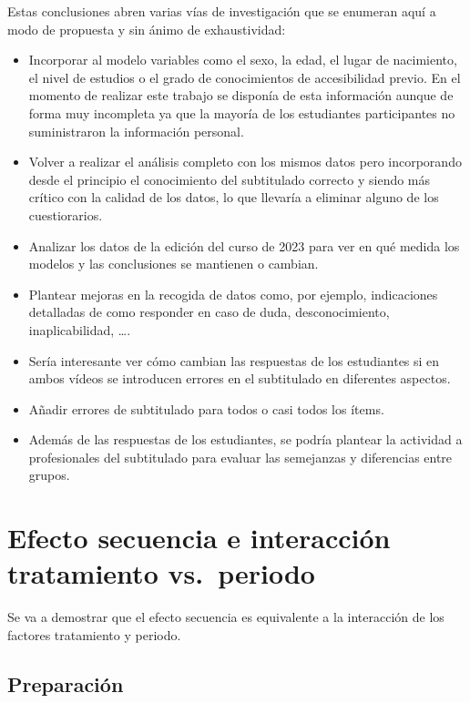 \documentclass[
  12pt,
  a4paper,
  extrafontsizes,
  onecolumn,
  openright,
  table]{memoir}
\providecommand{\tightlist}{%
  \setlength{\itemsep}{0pt}\setlength{\parskip}{0pt}}\usepackage{longtable,booktabs,array}
\begin{document}
Estas conclusiones abren varias vías de investigación que se enumeran
aquí a modo de propuesta y sin ánimo de exhaustividad:

\begin{itemize}
\tightlist
\item
  Incorporar al modelo variables como el sexo, la edad, el lugar de
  nacimiento, el nivel de estudios o el grado de conocimientos de
  accesibilidad previo. En el momento de realizar este trabajo se
  disponía de esta información aunque de forma muy incompleta ya que la
  mayoría de los estudiantes participantes no suministraron la
  información personal.
\item
  Volver a realizar el análisis completo con los mismos datos pero
  incorporando desde el principio el conocimiento del subtitulado
  correcto y siendo más crítico con la calidad de los datos, lo que
  llevaría a eliminar alguno de los cuestiorarios.
\item
  Analizar los datos de la edición del curso de 2023 para ver en qué
  medida los modelos y las conclusiones se mantienen o cambian.
\item
  Plantear mejoras en la recogida de datos como, por ejemplo,
  indicaciones detalladas de como responder en caso de duda,
  desconocimiento, inaplicabilidad, \ldots.
\item
  Sería interesante ver cómo cambian las respuestas de los estudiantes
  si en ambos vídeos se introducen errores en el subtitulado en
  diferentes aspectos.
\item
  Añadir errores de subtitulado para todos o casi todos los ítems.
\item
  Además de las respuestas de los estudiantes, se podría plantear la
  actividad a profesionales del subtitulado para evaluar las semejanzas
  y diferencias entre grupos.
\end{itemize}

\cleardoublepage
{}
{}
\appendix

\hypertarget{sec-contrasts}{%
\chapter{Efecto secuencia e interacción tratamiento
vs.~periodo}\label{sec-contrasts}}

Se va a demostrar que el \gls{efecto secuencia} es equivalente a la
interacción de los factores tratamiento y periodo.

\hypertarget{preparaciuxf3n}{%
\section{Preparación}\label{preparaciuxf3n}}
\end{document}
